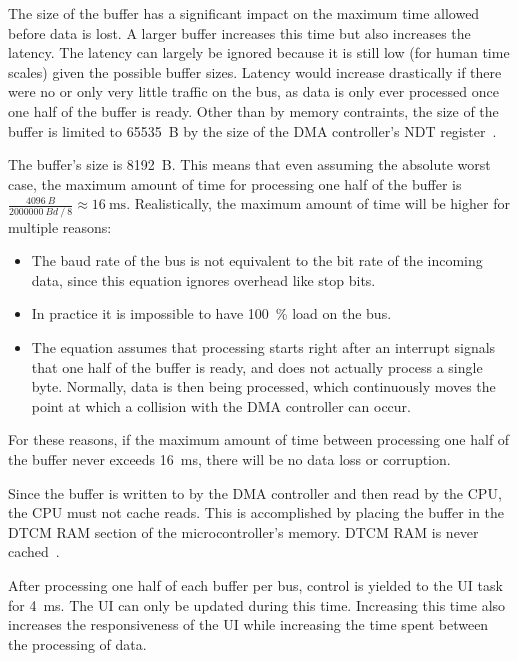 The size of the buffer has a significant impact on the maximum time allowed before data is lost. A
larger buffer increases this time but also increases the latency. The latency can largely be ignored
because it is still low (for human time scales) given the possible buffer sizes. Latency would
increase drastically if there were no or only very little traffic on the bus, as data is only ever
processed once one half of the buffer is ready. Other than by memory contraints, the size of the buffer
is limited to \SI{65535}{B} by the size of the DMA controller's NDT register~\cite{mcu-ref-manual}.

The buffer's size is \SI{8192}{B}. This means that even assuming the absolute worst case, the maximum
amount of time for processing one half of the buffer is
$\frac{\SI{4096}{B}}{\SI{2000000}{Bd} \mathbin{/} 8} \approx \SI{16}{\milli\second}$. Realistically,
the maximum amount of time will be higher for multiple reasons:

\begin{itemize}
    \item The baud rate of the bus is not equivalent to the bit rate of the incoming data, since
          this equation ignores overhead like stop bits.
    \item In practice it is impossible to have \SI{100}{\percent} load on the bus.
    \item The equation assumes that processing starts right after an interrupt signals that one half
          of the buffer is ready, and does not actually process a single byte. Normally, data is
          then being processed, which continuously moves the point at which a collision with the DMA
          controller can occur.
\end{itemize}

For these reasons, if the maximum amount of time between processing one half of the buffer never
exceeds \SI{16}{\milli\second}, there will be no data loss or corruption.

Since the buffer is written to by the DMA controller and then read by the CPU, the CPU must not cache
reads. This is accomplished by placing the buffer in the DTCM RAM section of the microcontroller's
memory. DTCM RAM is never cached~\cite{mcu-ref-manual}.

After processing one half of each buffer per bus, control is yielded to the UI task for \SI{4}{\milli\second}.
The UI can only be updated during this time. Increasing this time also increases the responsiveness
of the UI while increasing the time spent between the processing of data.

